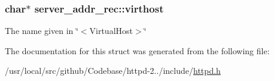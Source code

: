 \subsubsection[{\texorpdfstring{virthost}{virthost}}]{\setlength{\rightskip}{0pt plus 5cm}char$\ast$ server\+\_\+addr\+\_\+rec\+::virthost}\hypertarget{structserver__addr__rec_aaf703f04f5299efa3a1e81d32bfa9338}{}\label{structserver__addr__rec_aaf703f04f5299efa3a1e81d32bfa9338}
The name given in \char`\"{}$<$\+Virtual\+Host$>$\char`\"{} 

The documentation for this struct was generated from the following file\+:\begin{DoxyCompactItemize}
\item 
/usr/local/src/github/\+Codebase/httpd-\/2../include/\hyperlink{httpd_8h}{httpd.\+h}\end{DoxyCompactItemize}
